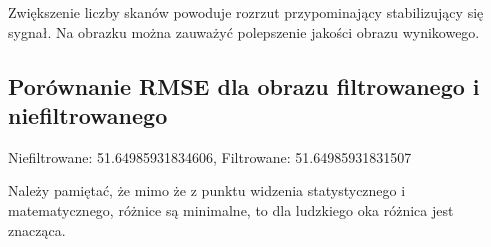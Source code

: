 \documentclass[11pt,a4paper]{article}
\begin{document}
    Zwiększenie liczby skanów powoduje rozrzut przypominający stabilizujący się sygnał.
    Na obrazku można zauważyć polepszenie jakości obrazu wynikowego.

    \subsection{Porównanie RMSE dla obrazu filtrowanego i niefiltrowanego}
    Niefiltrowane: 51.64985931834606, Filtrowane: 51.64985931831507

    Należy pamiętać, że mimo że z punktu widzenia statystycznego i matematycznego, różnice są minimalne,
    to dla ludzkiego oka różnica jest znacząca.
\end{document}
